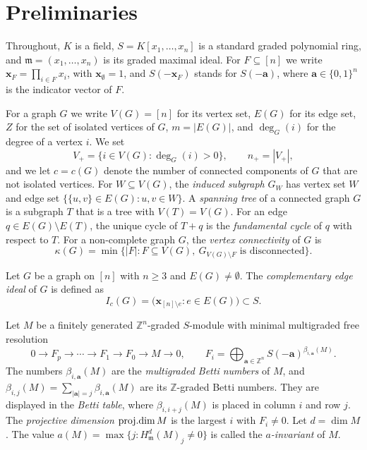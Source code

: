 \documentclass[12pt]{amsart}
\def\m{\mathfrak{m}}
\def\pd{\textup{proj.dim}}
\def\supp{\textup{supp}}
\begin{document}
	
\section{Preliminaries}\label{sec1}

Throughout, $K$ is a field, $S=K[x_1,\dots,x_n]$ is a standard graded polynomial ring, and $\m=(x_1,\dots,x_n)$ is its graded maximal ideal.
For $F\subseteq[n]$ we write $\mathbf x_F=\prod_{i\in F}x_i$, with $\mathbf x_\emptyset=1$, and $S(-\mathbf x_F)$ stands for $S(-\mathbf a)$, where $\mathbf a\in\{0,1\}^n$ is the indicator vector of $F$.

For a graph $G$ we write $V(G)=[n]$ for its vertex set, $E(G)$ for its edge set,  $Z$ for the set of isolated vertices of $G$, $m=|E(G)|$, and $\deg_G(i)$ for the degree of a vertex $i$. We set
\[
V_+=\{i\in V(G):\deg_G(i)>0\},\qquad n_+=|V_+|,
\]
and we let $c=c(G)$ denote the number of connected components of $G$ that are not isolated vertices. For $W\subseteq V(G)$, the \emph{induced subgraph} $G_W$ has vertex set $W$ and edge set $\{\{u,v\}\in E(G):u,v\in W\}$. A \emph{spanning tree} of a connected graph $G$ is a subgraph $T$ that is a tree with $V(T)=V(G)$. For an edge $q\in E(G)\setminus E(T)$, the unique cycle of $T+q$ is the \emph{fundamental cycle} of $q$ with respect to $T$. For a non-complete graph $G$, the \emph{vertex connectivity} of $G$ is
\[
\kappa(G)=\min\{|F|: F\subseteq V(G),\ G_{V(G)\setminus F}\text{ is disconnected}\}.
\]

 
Let $G$ be a graph on $[n]$ with $n\ge3$ and $E(G)\neq\emptyset$. The \emph{complementary edge ideal} of $G$ is defined as
\[
I_c(G)=\big(\mathbf x_{[n]\setminus e}: e\in E(G)\big)\subset S.
\]



Let $M$ be a finitely generated $\mathbb Z^n$-graded $S$-module with minimal multigraded free resolution
\[
0\to F_p\to\cdots\to F_1\to F_0\to M\to0,\qquad F_i=\bigoplus_{\mathbf a\in\mathbb Z^n}S(-\mathbf a)^{\beta_{i,\mathbf a}(M)} .
\]
The numbers $\beta_{i,\mathbf a}(M)$ are the \emph{multigraded Betti numbers} of $M$, and $\beta_{i,j}(M)=\sum_{|\mathbf a|=j}\beta_{i,\mathbf a}(M)$ are its $\mathbb Z$-graded Betti numbers. They are displayed in the \emph{Betti table}, where $\beta_{i,i+j}(M)$ is placed in column $i$ and row $j$. The \emph{projective dimension} $\pd\, M$ is the largest $i$ with $F_i\neq0$.
Let $d=\dim M$.
The value $a(M)=\max\{j : H^d_{\mathfrak m}(M)_j\neq0\}$ is called the {\em $a$-invariant} of $M$.
\end{document}
